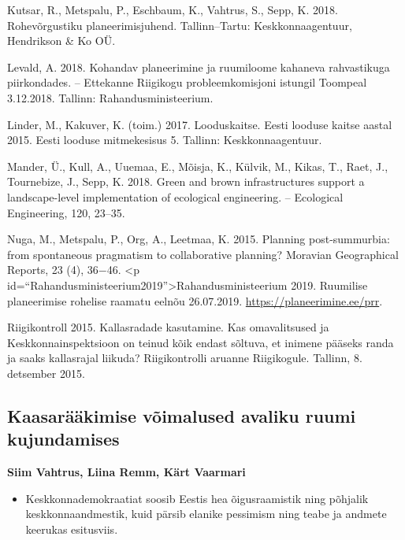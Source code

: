 \documentclass[estonian,]{article}
\providecommand{\tightlist}{%
  \setlength{\itemsep}{0pt}\setlength{\parskip}{0pt}}
\begin{document}
Kutsar, R., Metspalu, P., Eschbaum, K., Vahtrus, S., Sepp, K. 2018. Rohevõrgustiku planeerimisjuhend. Tallinn--Tartu: Keskkonnaagentuur, Hendrikson \& Ko OÜ.

Levald, A. 2018. Kohandav planeerimine ja ruumiloome kahaneva rahvastikuga piirkondades. -- Ettekanne Riigikogu probleemkomisjoni istungil Toompeal 3.12.2018. Tallinn: Rahandusministeerium.

Linder, M., Kakuver, K. (toim.) 2017. Looduskaitse. Eesti looduse kaitse aastal 2015. Eesti looduse mitmekesisus 5. Tallinn: Keskkonnaagentuur.

Mander, Ü., Kull, A., Uuemaa, E., Mõisja, K., Külvik, M., Kikas, T., Raet, J., Tournebize, J., Sepp, K. 2018. Green and brown infrastructures support a landscape-level implementation of ecological engineering. -- Ecological Engineering, 120, 23--35.

Nuga, M., Metspalu, P., Org, A., Leetmaa, K. 2015. Planning post-summurbia: from spontaneous pragmatism to collaborative planning? Moravian Geographical Reports, 23 (4), 36−46.
\textless{}p id=``Rahandusministeerium2019''\textgreater{}Rahandusministeerium 2019. Ruumilise planeerimise rohelise raamatu eelnõu 26.07.2019. \url{https://planeerimine.ee/prr}.

Riigikontroll 2015. Kallasradade kasutamine. Kas omavalitsused ja Keskkonnainspektsioon on teinud kõik endast sõltuva, et inimene pääseks randa ja saaks kallasrajal liikuda? Riigikontrolli aruanne Riigikogule. Tallinn, 8. detsember 2015.

\hypertarget{kaasaruxe4uxe4kimise-vuxf5imalused-avaliku-ruumi-kujundamises}{%
\subsection{Kaasarääkimise võimalused avaliku ruumi kujundamises}\label{kaasaruxe4uxe4kimise-vuxf5imalused-avaliku-ruumi-kujundamises}}

\begin{authors}
\textbf{Siim Vahtrus, Liina Remm, Kärt Vaarmari}
\end{authors}

\begin{points}
\begin{itemize}
\tightlist
\item
  Keskkonnademokraatiat soosib Eestis hea õigusraamistik ning põhjalik
  keskkonnaandmestik, kuid pärsib elanike pessimism ning teabe ja
  andmete keerukas esitusviis.
\end{itemize}
\end{points}
\end{document}
